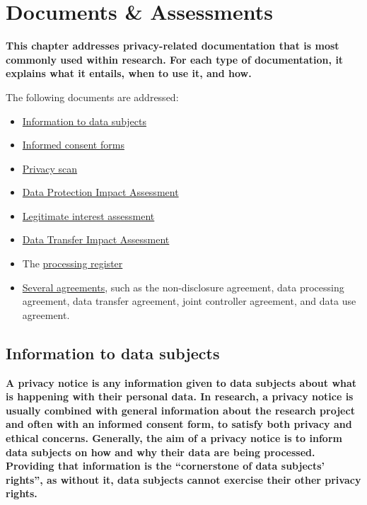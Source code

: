 \documentclass[
]{book}
\providecommand{\tightlist}{%
  \setlength{\itemsep}{0pt}\setlength{\parskip}{0pt}}
\begin{document}
\hypertarget{legal-documents}{%
\chapter{Documents \& Assessments}\label{legal-documents}}

\textbf{This chapter addresses privacy-related documentation that is most commonly used
within research. For each type of documentation, it explains what it entails,
when to use it, and how.}

The following documents are addressed:

\begin{itemize}
\tightlist
\item
  \protect\hyperlink{privacy-notices}{Information to data subjects}
\item
  \protect\hyperlink{informed-consent-forms}{Informed consent forms}
\item
  \protect\hyperlink{privacy-scan}{Privacy scan}
\item
  \protect\hyperlink{dpia}{Data Protection Impact Assessment}
\item
  \protect\hyperlink{legitimate-interest-assessment}{Legitimate interest assessment}
\item
  \protect\hyperlink{dtia}{Data Transfer Impact Assessment}
\item
  The \protect\hyperlink{processing-register}{processing register}
\item
  \protect\hyperlink{agreements}{Several agreements}, such as the non-disclosure agreement, data processing
  agreement, data transfer agreement, joint controller agreement, and data use
  agreement.
\end{itemize}

\hypertarget{privacy-notices}{%
\section{Information to data subjects}\label{privacy-notices}}

\textbf{A privacy notice is any information given to data subjects about what is
happening with their personal data. In research, a privacy notice is usually
combined with general information about the research project and often with an
informed consent form, to satisfy both privacy and ethical concerns. Generally,
the aim of a privacy notice is to inform data subjects on how and why their
data are being processed. Providing that information is the ``cornerstone of
data subjects' rights'', as without it, data subjects cannot exercise their other
privacy rights.}
\end{document}
